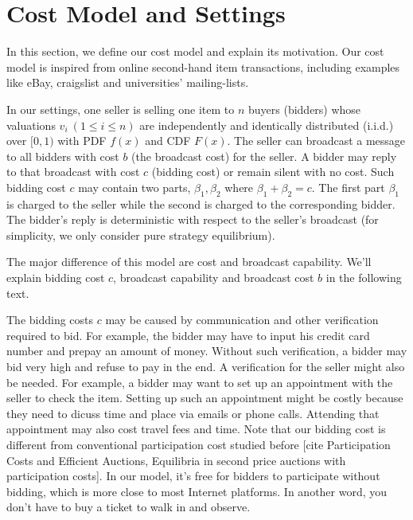 \section{Cost Model and Settings}

In this section, we define our cost model and explain its motivation. Our
cost model is inspired from online second-hand item transactions, including
examples like eBay, craigslist and universities' mailing-lists.


\begin{definition}\label{def:model}

In our settings, one seller is selling one item to $n$ buyers (bidders)
whose valuations $v_i~(1 \leq i \leq n)$ are independently and identically
distributed (i.i.d.) over $[0, 1)$ with PDF $f(x)$ and CDF $F(x)$. The seller
can broadcast a message to all bidders with cost $b$ (the broadcast cost) for
the seller.  A bidder may reply to that broadcast with cost $c$ (bidding cost)
or remain silent with no cost. Such bidding cost $c$ may contain two parts,
$\beta_1, \beta_2$ where $\beta_1+\beta_2 = c$.  The first part $\beta_1$ is
charged to the seller while the second is charged to the corresponding bidder.
The bidder's reply is deterministic with respect to the seller's
broadcast (for simplicity, we only consider pure strategy equilibrium).

\end{definition}

The major difference of this model are cost and broadcast capability. We'll
explain bidding cost $c$, broadcast capability and broadcast cost $b$ in
the following text.

The bidding costs $c$ may be caused by communication and other verification
required to bid. For example, the bidder may have to input
his credit card number and prepay an amount of money. Without such verification, 
a bidder may bid very high and refuse to pay in the end. A
verification for the seller might also be needed. For example, a bidder may
want to set up an appointment with the seller to check the item.  Setting up
such an appointment might be costly because they need to dicuss time and place
via emails or phone calls.  Attending that appointment may also cost travel
fees and time.  Note that our bidding cost is different from conventional
participation cost studied before [cite Participation Costs and Efficient
Auctions, Equilibria in second price auctions with participation costs]. In our
model, it's free for bidders to participate without bidding, which is more
close to most Internet platforms. In another
word, you don't have to buy a ticket to walk in and observe.

